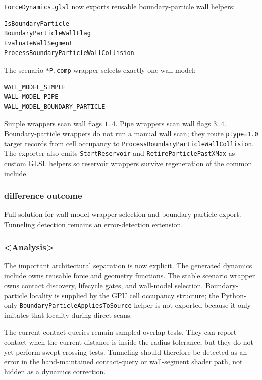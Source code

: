 \texttt{ForceDynamics.glsl} now exports reusable boundary-particle wall
helpers:

\begin{verbatim}
IsBoundaryParticle
BoundaryParticleWallFlag
EvaluateWallSegment
ProcessBoundaryParticleWallCollision
\end{verbatim}

The scenario \texttt{*P.comp} wrapper selects exactly one wall model:

\begin{verbatim}
WALL_MODEL_SIMPLE
WALL_MODEL_PIPE
WALL_MODEL_BOUNDARY_PARTICLE
\end{verbatim}

Simple wrappers scan wall flags \(1..4\).  Pipe wrappers scan wall flags
\(3..4\).  Boundary-particle wrappers do not run a manual wall scan; they
route \texttt{ptype=1.0} target records from cell occupancy to
\texttt{ProcessBoundaryParticleWallCollision}.  The exporter also emits
\texttt{StartReservoir} and \texttt{RetireParticlePastXMax} as custom GLSL
helpers so reservoir wrappers survive regeneration of the common include.

\subsubsection{difference outcome}

Full solution for wall-model wrapper selection and boundary-particle export.
Tunneling detection remains an error-detection extension.

\subsubsection{<Analysis>}

The important architectural separation is now explicit.  The generated
dynamics include owns reusable force and geometry functions.  The stable
scenario wrapper owns contact discovery, lifecycle gates, and wall-model
selection.  Boundary-particle locality is supplied by the GPU cell occupancy
structure; the Python-only \texttt{BoundaryParticleAppliesToSource} helper is
not exported because it only imitates that locality during direct scans.

The current contact queries remain sampled overlap tests.  They can report
contact when the current distance is inside the radius tolerance, but they do
not yet perform swept crossing tests.  Tunneling should therefore be detected
as an error in the hand-maintained contact-query or wall-segment shader path,
not hidden as a dynamics correction.

